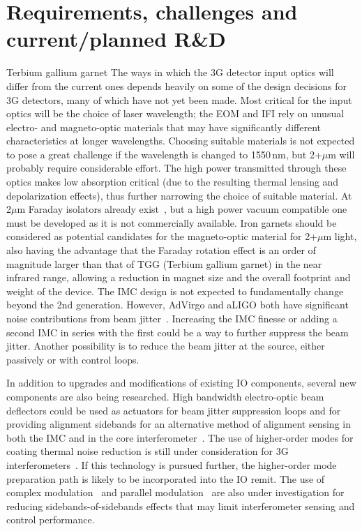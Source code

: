 \section{Requirements, challenges and current/planned R\&D}
Terbium gallium garnet The ways in which the 3G detector input optics will differ from the current ones depends heavily on some of the design decisions for 3G detectors, many of which have not yet been made. Most critical for the input optics will be the choice of laser wavelength; the EOM and IFI rely on unusual electro- and magneto-optic materials that may have significantly different characteristics at longer wavelengths. Choosing suitable materials is not expected to pose a great challenge if the wavelength is changed to 1550\,nm, but 2+$\mu$m will probably require considerable effort. The high power transmitted through these optics makes low absorption critical (due to the resulting thermal lensing and depolarization effects), thus further narrowing the choice of suitable material. At 2$\mu$m Faraday isolators already exist~\cite{EOTFI}, but a high power vacuum compatible one must be developed as it is not commercially available. Iron garnets should be considered as potential candidates for the magneto-optic material for 2+$\mu$m light, also having the advantage that the Faraday rotation effect is an order of magnitude larger than that of TGG (Terbium gallium garnet) in the near infrared range, allowing a reduction in magnet size and the overall footprint and weight of the device.
The IMC design is not expected to fundamentally change beyond the 2nd generation.  However, AdVirgo and aLIGO both have significant noise contributions from beam jitter~\cite{aLIGOjitter,adVirgojitter}. Increasing the IMC finesse or adding a second IMC in series with the first could be a way to further suppress the beam jitter. Another possibility is to reduce the beam jitter at the source, either passively or with 
control loops.  

In addition to upgrades and modifications of existing IO components, several new components are also being researched. High bandwidth electro-optic beam deflectors could be used as actuators for beam jitter suppression loops and for providing alignment sidebands for an alternative method of alignment sensing in both the IMC and in the core interferometer~\cite{RFJASC}. The use of higher-order modes for coating thermal noise reduction is still under consideration for 3G interferometers~\cite{LGmodes}. If this technology is pursued further, the higher-order mode preparation path is likely to be incorporated into the IO remit. The use of complex modulation~\cite{complexmod} and parallel modulation~\cite{kagraMZI} are also under investigation for reducing sidebands-of-sidebands effects that may limit interferometer sensing and control performance.

